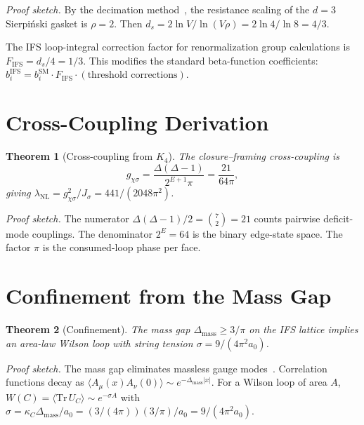\documentclass[11pt,twocolumn]{article}
\newtheorem{theorem}{Theorem}
\begin{document}
\textit{Proof sketch.}
By the decimation method~\cite{rammal1984}, the resistance scaling of the $d=3$ Sierpi\'nski gasket is $\rho=2$.
Then $d_s=2\ln V/\ln(V\rho)=2\ln 4/\ln 8=4/3$.

The IFS loop-integral correction factor for renormalization group calculations is $F_{\mathrm{IFS}}=d_s/4=1/3$.
This modifies the standard beta-function coefficients: $b_i^{\mathrm{IFS}}=b_i^{\mathrm{SM}}\cdot F_{\mathrm{IFS}}\cdot(\text{threshold corrections})$.

\section{Cross-Coupling Derivation}
\label{sec:coupling}

\begin{theorem}[Cross-coupling from $K_4$]
\label{thm:gxs}
The closure--framing cross-coupling is
\begin{equation}
g_{\chi\sigma} = \frac{\Delta(\Delta{-}1)}{2^{E+1}\pi} = \frac{21}{64\pi},
\label{eq:gxs}
\end{equation}
giving $\lambda_{\mathrm{NL}}=g_{\chi\sigma}^2/J_\sigma = 441/(2048\pi^2)$.
\end{theorem}

\textit{Proof sketch.}
The numerator $\Delta(\Delta{-}1)/2=\binom{7}{2}=21$ counts pairwise deficit-mode couplings.
The denominator $2^E=64$ is the binary edge-state space.
The factor $\pi$ is the consumed-loop phase per face.

\section{Confinement from the Mass Gap}
\label{sec:confinement}

\begin{theorem}[Confinement]
\label{thm:confine}
The mass gap $\Delta_{\mathrm{mass}}\geq 3/\pi$ on the IFS lattice implies an area-law Wilson loop with string tension $\sigma=9/(4\pi^2 a_0)$.
\end{theorem}

\textit{Proof sketch.}
The mass gap eliminates massless gauge modes~\cite{wilson1974}.
Correlation functions decay as $\langle A_\mu(x)A_\nu(0)\rangle\sim e^{-\Delta_{\mathrm{mass}}|x|}$.
For a Wilson loop of area $A$, $W(C)=\langle\mathrm{Tr}\,U_C\rangle\sim e^{-\sigma A}$ with $\sigma=\kappa_C\Delta_{\mathrm{mass}}/a_0 = (3/(4\pi))(3/\pi)/a_0=9/(4\pi^2 a_0)$.
\end{document}

